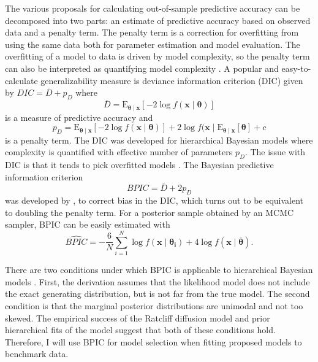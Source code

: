 \documentclass[12pt]{article}
\begin{document}
The various proposals for calculating out-of-sample predictive
accuracy can be decomposed into two parts: an estimate of predictive
accuracy based on observed data and a penalty term. The penalty term
is a correction for overfitting from using the same data both
for parameter estimation and model evaluation. The overfitting of a model to
data is driven by model complexity, so the penalty term can also be interpreted as quantifying
model complexity \citep{MyuKar2008,GelHwa2013}. A popular and easy-to-calculate generalizability
measure is deviance information criterion (DIC) \citep{SpiBes2002} given by $DIC = \overline D + p_D$
where
%
\begin{equation}
\overline D = \operatorname{E_{\boldsymbol{\theta} \mid \boldsymbol{x}}}[-2\operatorname{log}f(\boldsymbol{x} \mid \boldsymbol{\theta})]
\end{equation}
%
is a measure of predictive accuracy and 
%
\begin{equation}
p_D = \operatorname{E_{\boldsymbol{\theta} \mid \boldsymbol{x}}}[-2\operatorname{log}f(\boldsymbol{x} \mid \boldsymbol{\theta})] + 2\operatorname{log}f(\boldsymbol{x} \mid \operatorname{E_{\boldsymbol{\theta} \mid \boldsymbol{x}}}[\boldsymbol{\theta}] + c
\end{equation}
%
is a penalty term.  The DIC was developed for
hierarchical Bayesian models where complexity is quantified with
effective number of parameters $p_D$. The issue with DIC is that it
tends to pick overfitted models \citep{GelHwa2013}.  The
Bayesian predictive information criterion 
% 
\begin{equation} BPIC = \overline D + 2p_D \end{equation} 
% 
was developed by \citet{Ano2007,Ano2011}, to correct bias in
the DIC, which turns out to be equivalent to doubling the
penalty term. For a posterior sample obtained by an MCMC sampler,
BPIC can be easily estimated with
%
\begin{equation}
\hat{BPIC} = -\frac{6}{N}\sum_{i=1}^N \operatorname{log}f(\boldsymbol{x} \mid \boldsymbol{\theta_i}) + 4\operatorname{log}f(\boldsymbol{x} \mid  \boldsymbol{\overline\theta}).
\end{equation}
 
There are two conditions under which BPIC is applicable to
hierarchical Bayesian models \citep{Ano2011}. First, the derivation
assumes that the likelihood model does not include the exact
generating distribution, but is not far from the true model. The
second condition is that the marginal posterior distributions
are unimodal and not too skewed. The empirical success of the Ratcliff
diffusion model \citep{RatMck2008,Wag2009,VanTue2011} and prior
hierarchical fits of the model suggest that both of these conditions
hold. Therefore, I will use BPIC for model selection when fitting
proposed models to benchmark data.
\end{document}
